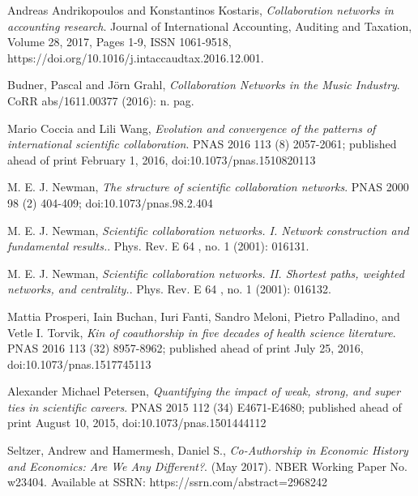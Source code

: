 \documentclass{beamer}
\begin{document}
\begin{thebibliography}{56}
	Andreas Andrikopoulos and Konstantinos Kostaris,
	\emph{Collaboration networks in accounting research}.
	Journal of International Accounting, Auditing and Taxation, Volume 28, 2017, Pages 1-9, ISSN 1061-9518, https://doi.org/10.1016/j.intaccaudtax.2016.12.001.
	
	Budner, Pascal and Jörn Grahl,
	\emph{Collaboration Networks in the Music Industry}.
	CoRR abs/1611.00377 (2016): n. pag.
	
	Mario Coccia and Lili Wang,
	\emph{Evolution and convergence of the patterns of international scientific collaboration}.
	PNAS 2016 113 (8) 2057-2061; published ahead of print February 1, 2016, doi:10.1073/pnas.1510820113
	
	M. E. J. Newman,
	\emph{The structure of scientific collaboration networks}.
	PNAS 2000 98 (2) 404-409; doi:10.1073/pnas.98.2.404
	
	M. E. J. Newman,
	\emph{Scientific collaboration networks. I. Network construction and fundamental results.}.
	Phys. Rev. E 64 , no. 1 (2001): 016131.
	
	M. E. J. Newman,
	\emph{Scientific collaboration networks. II. Shortest paths, weighted networks, and centrality.}.
	Phys. Rev. E 64 , no. 1 (2001): 016132.
	
	Mattia Prosperi, Iain Buchan, Iuri Fanti, Sandro Meloni, Pietro Palladino, and Vetle I. Torvik,
	\emph{Kin of coauthorship in five decades of health science literature}.
	PNAS 2016 113 (32) 8957-8962; published ahead of print July 25, 2016, doi:10.1073/pnas.1517745113
	
	
	Alexander Michael Petersen,
	\emph{Quantifying the impact of weak, strong, and super ties in scientific careers}.
	PNAS 2015 112 (34) E4671-E4680; published ahead of print August 10, 2015, doi:10.1073/pnas.1501444112
	
	Seltzer, Andrew and Hamermesh, Daniel S.,
	\emph{Co-Authorship in Economic History and Economics: Are We Any Different?}.
	(May 2017). NBER Working Paper No. w23404. Available at SSRN: https://ssrn.com/abstract=2968242
	
\end{thebibliography}
\end{document}
